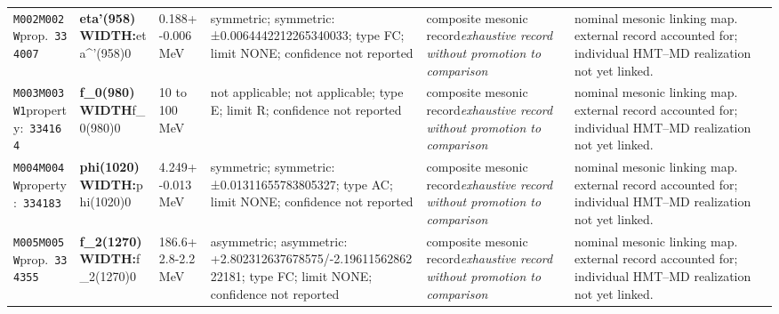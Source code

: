 \begin{landscape}
\begin{longtable}{L{1.85cm}L{4.45cm}L{2.35cm}L{4.05cm}L{3.35cm}L{7.15cm}}
\texttt{M002}\newline \texttt{M002W}\newline prop.\ \texttt{334007} & \textbf{eta'(958) WIDTH:}\newline eta\textasciicircum{}'(958)0 & 0.188+-0.006\,MeV & symmetric; symmetric: ±0.0064442212265340033; type FC; limit NONE; confidence not reported & composite mesonic record\newline \emph{exhaustive record without promotion to comparison} & nominal mesonic linking map. external record accounted for; individual HMT--MD realization not yet linked. \\
\texttt{M003}\newline \texttt{M003W1}\newline property:\ \texttt{334164} & \textbf{f\_\allowbreak{}0(980) WIDTH}\newline f\_\allowbreak{}0(980)0 & 10 to 100\,MeV & not applicable; not applicable; type E; limit R; confidence not reported & composite mesonic record\newline \emph{exhaustive record without promotion to comparison} & nominal mesonic linking map. external record accounted for; individual HMT--MD realization not yet linked. \\
\texttt{M004}\newline \texttt{M004W}\newline property:\ \texttt{334183} & \textbf{phi(1020) WIDTH:}\newline phi(1020)0 & 4.249+-0.013\,MeV & symmetric; symmetric: ±0.01311655783805327; type AC; limit NONE; confidence not reported & composite mesonic record\newline \emph{exhaustive record without promotion to comparison} & nominal mesonic linking map. external record accounted for; individual HMT--MD realization not yet linked. \\
\texttt{M005}\newline \texttt{M005W}\newline prop.\ \texttt{334355} & \textbf{f\_\allowbreak{}2(1270) WIDTH:}\newline f\_\allowbreak{}2(1270)0 & 186.6+2.8-2.2\,MeV & asymmetric; asymmetric: +2.802312637678575/-2.1961156286222181; type FC; limit NONE; confidence not reported & composite mesonic record\newline \emph{exhaustive record without promotion to comparison} & nominal mesonic linking map. external record accounted for; individual HMT--MD realization not yet linked. \\

\end{longtable}
\end{landscape}
